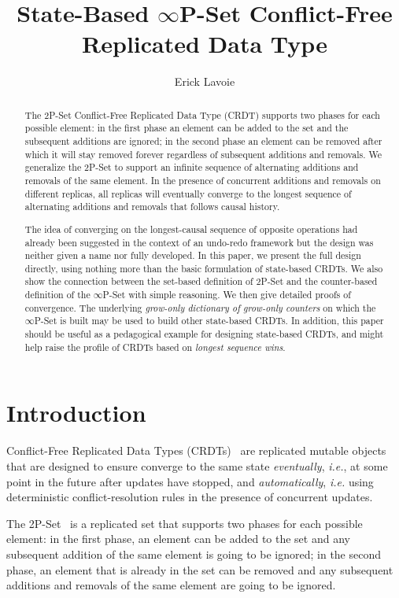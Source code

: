 \documentclass[9pt, oneside]{article}   	%
\title{State-Based $\infty$P-Set Conflict-Free Replicated Data Type}
\author{Erick Lavoie}
\begin{document}
\maketitle


\begin{abstract}
The 2P-Set Conflict-Free Replicated Data Type (CRDT) supports two phases for each possible element: in the first phase an element can be added to the set and the subsequent additions are ignored; in the second phase an element can be removed after which it will stay removed forever regardless of subsequent additions and removals. We generalize the 2P-Set to support an infinite sequence of alternating additions and removals of the same element. In the presence of concurrent additions and removals on different replicas, all replicas will eventually converge to the longest sequence of alternating additions and removals that follows causal history. 

The idea of converging on the longest-causal sequence of opposite operations had already been suggested in the context of an undo-redo framework but the design was neither given a name nor fully developed. In this paper, we present the full design directly, using nothing more than the basic formulation of state-based CRDTs. We also show the connection between the set-based definition of 2P-Set and the counter-based definition of the $\infty$P-Set with simple reasoning. We then give detailed proofs of convergence. The underlying \textit{grow-only dictionary of grow-only counters} on which the $\infty$P-Set is built may be used to build other state-based CRDTs. In addition, this paper should be useful as a pedagogical example for designing state-based CRDTs, and might help raise the profile of CRDTs based on \textit{longest sequence wins}.
\end{abstract}

\section{Introduction}

Conflict-Free Replicated Data Types (CRDTs)~\cite{shapiro:hal-00932836} are replicated mutable objects that are designed to ensure converge to the same state \textit{eventually}, \textit{i.e.}, at some point in the future after updates have stopped, and \textit{automatically}, \textit{i.e.} using deterministic conflict-resolution rules in the presence of concurrent updates. 

The 2P-Set~\cite{shapiro:inria-00555588} is a replicated set that supports two phases for each possible element: in the first phase, an element can be added to the set and any subsequent addition of the same element is going to be ignored; in the second phase, an element that is already in the set can be removed and any subsequent additions and removals of the same element are going to be ignored.
\end{document}
